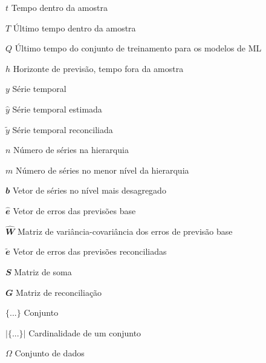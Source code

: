 \begin{simbolos}
  \item[$ t $] Tempo dentro da amostra
  \item[$ T $] Último tempo dentro da amostra
  \item[$ Q $] Último tempo do conjunto de treinamento para os modelos de ML
  \item[$ h $] Horizonte de previsão, tempo fora da amostra
  \item[$ y $] Série temporal
  \item[$ \hat{y} $] Série temporal estimada
  \item[$ \tilde{y} $] Série temporal reconciliada
  \item[$ n $] Número de séries na hierarquia
  \item[$ m $] Número de séries no menor nível da hierarquia
  \item[$ \mathbfit{b} $] Vetor de séries no nível mais desagregado
  \item[$ \mathbfit{\hat{e}} $] Vetor de erros das previsões base
  \item[$ \mathbfit{\hat{W}} $] Matriz de variância-covariância dos erros de previsão base
  \item[$ \mathbfit{\tilde{e}} $] Vetor de erros das previsões reconciliadas
  \item[$ \mathbfit{S} $] Matriz de soma
  \item[$ \mathbfit{G} $] Matriz de reconciliação
  \item[$ \{...\} $] Conjunto
  \item[$ |\{...\}| $] Cardinalidade de um conjunto
  \item[$ \Omega $] Conjunto de dados
\end{simbolos}

\tableofcontents*
\cleardoublepage

\textual
\pagestyle{simple}
